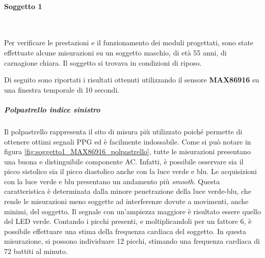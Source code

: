 \clearpage

\paragraph{Soggetto 1}~

\vspace{1cm}

\noindent Per verificare le prestazioni e il funzionamento dei moduli progettati, sono state effettuate alcune misurazioni su un soggetto maschio, di età 55 anni, di carnagione chiara. Il soggetto si trovava in condizioni di riposo.

\vspace{0.5cm}

\noindent Di seguito sono riportati i risultati ottenuti utilizzando il sensore \textbf{MAX86916} su una finestra temporale di 10 secondi.

\subparagraph{Polpastrello indice sinistro}

Il polpastrello rappresenta il sito di misura più utilizzato poiché permette di ottenere ottimi segnali PPG ed è facilmente indossabile. Come si può notare in figura \ref{fig:soggetto1_MAX86916_polpastrello}, tutte le misurazioni presentano una buona e distinguibile componente AC. Infatti, è possibile osservare sia il picco sistolico sia il picco diastolico anche con la luce verde e blu. Le acquisizioni con la luce verde e blu presentano un andamento più \textit{smooth}. Questa caratteristica è determinata dalla minore penetrazione della luce verde-blu, che rende le misurazioni meno soggette ad interferenze dovute a movimenti, anche minimi, del soggetto. Il segnale con un'ampiezza maggiore è risultato essere quello del LED verde. Contando i picchi presenti, e moltiplicandoli per un fattore 6, è possibile effettuare una stima della frequenza cardiaca del soggetto. In questa misurazione, si possono individuare 12 picchi, stimando una frequenza cardiaca di 72 battiti al minuto.

